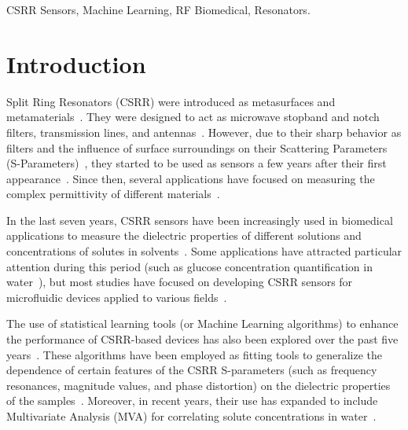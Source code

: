 \documentclass[journal,twoside,web]{ieeecolor}
\begin{document}
{{\begin{minipage}{\textwidth}
\begin{IEEEkeywords}
CSRR Sensors, Machine Learning, RF Biomedical, Resonators.
\end{IEEEkeywords}
\end{minipage}}}
\maketitle
\section{Introduction}
\label{sec:intro}
 Split Ring Resonators (CSRR) were introduced as metasurfaces and metamaterials~\cite{falcone2004, Baena2005}. They were designed to act as microwave stopband and notch filters, transmission lines, and antennas~\cite{GGarcia2005, Bonache2006, Mandal2006, Gil2007, Velez2008, Zhang2009}. However, due to their sharp behavior as filters and the influence of surface surroundings on their Scattering Parameters (S-Parameters)~\cite{Grzegorczyk2005, Stevanovic2006, Bonache2006}, they started to be used as sensors a few years after their first appearance~\cite{Boybay2012}. Since then, several applications have focused on measuring the complex permittivity of different materials~\cite{Song2013, Lee2014, Lee2014_2, Ansari2015, Standaert2017, Su2019}.

In the last seven years, CSRR sensors have been increasingly used in biomedical applications to measure the dielectric properties of different solutions and concentrations of solutes in solvents~\cite{Velez2018, Omer2021, Zhang2019}. Some applications have attracted particular attention during this period (such as glucose concentration quantification in water~\cite{Omer2021, Martinic2025}), but most studies have focused on developing CSRR sensors for microfluidic devices applied to various fields~\cite{Patel2022, Jiang2023, Liu2024, Zhang2024}.

The use of statistical learning tools (or Machine Learning algorithms) to enhance the performance of CSRR-based devices has also been explored over the past five years~\cite{Prakash2022, Harrison2020, Kazemi2022, Abdolrazzaghi2023}. These algorithms have been employed as fitting tools to generalize the dependence of certain features of the CSRR S-parameters (such as frequency resonances, magnitude values, and phase distortion)  on the dielectric properties of the samples~\cite{Martinic2025}. Moreover, in recent years, their use has expanded to include Multivariate Analysis (MVA) for correlating solute concentrations in water~\cite{Trovarello2024}.
\end{document}
